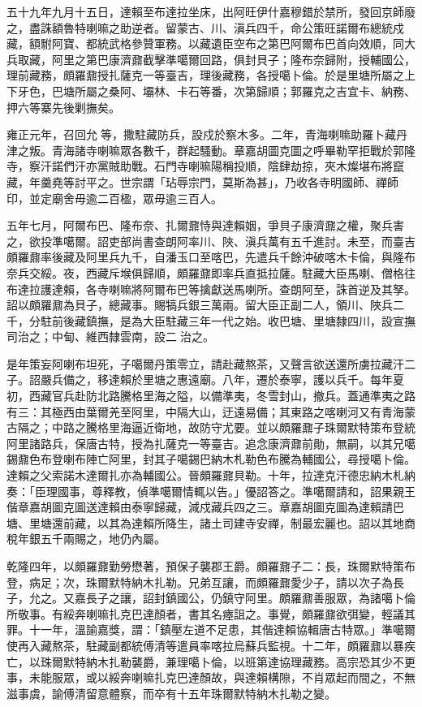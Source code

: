 \begin{pinyinscope}
五十九年九月十五日，達賴至布達拉坐床，出阿旺伊什嘉穆錯於禁所，發回京師廢之，盡誅額魯特喇嘛之助逆者。留蒙古、川、滇兵四千，命公策旺諾爾布總統戍藏，額駙阿寶、都統武格參贊軍務。以藏遺臣空布之第巴阿爾布巴首向效順，同大兵取藏，阿里之第巴康濟鼐截擊準噶爾回路，俱封貝子；隆布奈歸附，授輔國公，理前藏務，頗羅鼐授扎薩克一等臺吉，理後藏務，各授噶卜倫。於是里塘所屬之上下牙色，巴塘所屬之桑阿、壩林、卡石等番，次第歸順；郭羅克之吉宜卡、納務、押六等寨先後剿撫矣。

雍正元年，召回允等，撒駐藏防兵，設戍於察木多。二年，青海喇嘛助羅卜藏丹津之叛。青海諸寺喇嘛眾各數千，群起騷動。章嘉胡圖克圖之呼畢勒罕拒戰於郭隆寺，察汗諾們汗亦黨賊助戰。石門寺喇嘛陽稱投順，陰肆劫掠，夾木燦堪布將竄藏，年羹堯等討平之。世宗謂「玷辱宗門，莫斯為甚」，乃收各寺明國師、禪師印，並定廟舍毋逾二百楹，眾毋逾三百人。

五年七月，阿爾布巴、隆布奈、扎爾鼐恃與達賴姻，爭貝子康濟鼐之權，聚兵害之，欲投準噶爾。詔吏部尚書查朗阿率川、陜、滇兵萬有五千進討。未至，而臺吉頗羅鼐率後藏及阿里兵九千，自潘玉口至喀巴，先遣兵千餘沖破喀木卡倫，與隆布奈兵交綏。夜，西藏斥堠俱歸順，頗羅鼐即率兵直抵拉薩。駐藏大臣馬喇、僧格往布達拉護達賴，各寺喇嘛將阿爾布巴等擒獻送馬喇所。查朗阿至，誅首逆及其孥。詔以頗羅鼐為貝子，總藏事。賜犒兵銀三萬兩。留大臣正副二人，領川、陜兵二千，分駐前後藏鎮撫，是為大臣駐藏三年一代之始。收巴塘、里塘隸四川，設宣撫司治之；中甸、維西隸雲南，設二治之。

是年策妄阿喇布坦死，子噶爾丹策零立，請赴藏熬茶，又聲言欲送還所虜拉藏汗二子。詔嚴兵備之，移達賴於里塘之惠遠廟。八年，遷於泰寧，護以兵千。每年夏初，西藏官兵赴防北路騰格里海之隘，以備準夷，冬雪封山，撤兵。蓋通準夷之路有三：其極西由葉爾羌至阿里，中隔大山，迂遠易備；其東路之喀喇河又有青海蒙古隔之；中路之騰格里海逼近衛地，故防守尤要。並以頗羅鼐子珠爾默特策布登統阿里諸路兵，保唐古特，授為扎薩克一等臺吉。追念康濟鼐前勛，無嗣，以其兄噶錫鼐色布登喇布陣亡阿里，封其子噶錫巴納木札勒色布騰為輔國公，尋授噶卜倫。達賴之父索諾木達爾扎亦為輔國公。晉頗羅鼐貝勒。十年，拉達克汗德忠納木札納奏：「臣理國事，尊釋教，偵準噶爾情輒以告。」優詔答之。準噶爾請和，詔果親王偕章嘉胡圖克圖送達賴由泰寧歸藏，減戍藏兵四之三。章嘉胡圖克圖為達賴請巴塘、里塘還前藏，以其為達賴所降生，諸土司建寺安禪，制最宏麗也。詔以其地商稅年銀五千兩賜之，地仍內屬。

乾隆四年，以頗羅鼐勤勞懋著，預保子襲郡王爵。頗羅鼐子二：長，珠爾默特策布登，病足；次，珠爾默特納木扎勒。兄弟互讓，而頗羅鼐愛少子，請以次子為長子，允之。又嘉長子之讓，詔封鎮國公，仍鎮守阿里。頗羅鼐善服眾，為諸噶卜倫所敬事。有綏奔喇嘛扎克巴達顏者，書其名瘞詛之。事覺，頗羅鼐欲弭變，輕議其罪。十一年，溫諭嘉獎，謂：「鎮壓左道不足患，其偕達賴協輯唐古特眾。」準噶爾使再入藏熬茶，駐藏副都統傅清等遣員率喀拉烏蘇兵監視。十二年，頗羅鼐以暴疾亡，以珠爾默特納木扎勒襲爵，兼理噶卜倫，以班第達協理藏務。高宗恐其少不更事，未能服眾，或以綏奔喇嘛扎克巴達顏故，與達賴構隙，不肖眾起而間之，不無滋事虞，諭傅清留意體察，而卒有十五年珠爾默特納木扎勒之變。


\end{pinyinscope}
